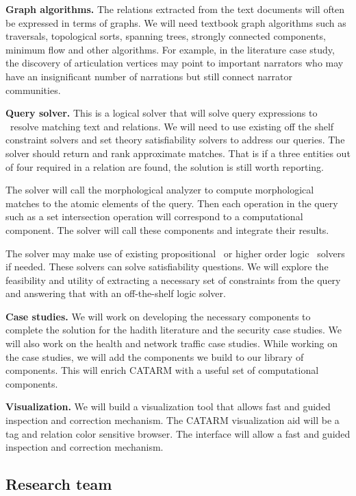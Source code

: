\documentclass[12pt]{article}
\begin{document}
{\bf Graph algorithms.}
The relations extracted from the text documents will often 
be expressed in terms of graphs.
We will need textbook graph algorithms such as traversals, 
topological sorts, spanning trees, strongly connected 
components, minimum flow  and other algorithms.
For example, in the literature case study, the discovery
of articulation vertices may point to important narrators 
who may have an insignificant number of narrations 
but still connect narrator communities.

{\bf Query solver.}
This is a logical solver that will solve query expressions to \
resolve matching text and relations.
We will need to use existing off the shelf constraint solvers 
and set theory satisfiability solvers to address our queries. 
The solver should return and rank approximate matches.
That is if a three entities out of four required in a relation are
found, the solution is still worth reporting. 

The solver will call the morphological analyzer to compute 
morphological matches to the atomic elements of the query. 
Then each operation in the query such as a set intersection
operation will correspond to a computational component. 
The solver will call these components and integrate their
results. 

The solver may make use of existing 
propositional~\cite{MiniSAT04} or
higher order logic~\cite{Z308} solvers if needed. 
These solvers can solve satisfiability questions.
We will explore the feasibility and utility 
of extracting a necessary set of 
constraints from the query and answering that with an off-the-shelf
logic solver. 

{\bf Case studies.}
We will work on developing the necessary components to complete 
the solution for the hadith literature and the security case 
studies.
We will also work on the health and network traffic case studies.
While working on the case studies, we will add the components
we build to our library of components. 
This will enrich CATARM with a useful set of computational 
components. 

{\bf Visualization.} 
We will build a visualization tool that allows fast 
and guided inspection and correction mechanism. 
The CATARM visualization aid will be a tag and relation color
sensitive browser.
The interface will allow a fast and guided inspection and 
correction mechanism.

\subsection{Research team}
\end{document}
